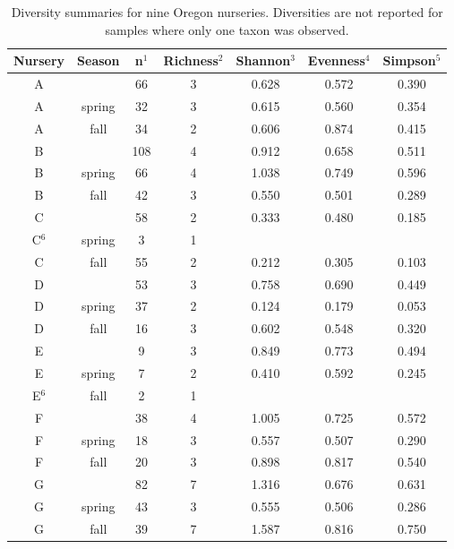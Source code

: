 \documentclass[12pt]{article}
\begin{document}
\begin{table}[ht]
\centering
\caption{Diversity summaries for nine Oregon nurseries.  Diversities are not reported for samples where only one taxon was observed.}
\label{tab:div}
\begin{tabular}{ccccccc}
  \hline
 \textbf{Nursery} &  \textbf{Season} & \textbf{n}$^{1}$ & \textbf{Richness}$^{2}$ & \textbf{Shannon}$^{3}$ & \textbf{Evenness}$^{4}$ & \textbf{Simpson}$^{5}$ \\ 
  \hline
  \rowcolor{gray!20}
  A & & 66 & 3 & 0.628 & 0.572 & 0.390 \\ 
  A & spring & 32 & 3 & 0.615 & 0.560 & 0.354 \\ 
  A & fall & 34 & 2 & 0.606 & 0.874 & 0.415 \\ 
\rowcolor{gray!20}
  B & & 108 & 4 & 0.912 & 0.658 & 0.511 \\ 
  B & spring & 66 & 4 & 1.038 & 0.749 & 0.596 \\ 
  B & fall & 42 & 3 & 0.550 & 0.501 & 0.289 \\ 
\rowcolor{gray!20}
  C & & 58 & 2 & 0.333 & 0.480 & 0.185 \\ 
  C$^{6}$ & spring & 3 & 1 &  &  &  \\ 
  C & fall & 55 & 2 & 0.212 & 0.305 & 0.103 \\ 
  \rowcolor{gray!20}
  D & & 53 & 3 & 0.758 & 0.690 & 0.449 \\ 
  D & spring & 37 & 2 & 0.124 & 0.179 & 0.053 \\ 
  D & fall & 16 & 3 & 0.602 & 0.548 & 0.320 \\ 
  \rowcolor{gray!20}
  E & & 9 & 3 & 0.849 & 0.773 & 0.494 \\ 
  E & spring & 7 & 2 & 0.410 & 0.592 & 0.245 \\ 
  E$^{6}$ & fall & 2 & 1 &  &  &  \\ 
  \rowcolor{gray!20}
  F & & 38 & 4 & 1.005 & 0.725 & 0.572 \\ 
  F & spring & 18 & 3 & 0.557 & 0.507 & 0.290 \\ 
  F & fall & 20 & 3 & 0.898 & 0.817 & 0.540 \\ 
  \rowcolor{gray!20}
  G & & 82 & 7 & 1.316 & 0.676 & 0.631 \\ 
  G & spring & 43 & 3 & 0.555 & 0.506 & 0.286 \\ 
  G & fall & 39 & 7 & 1.587 & 0.816 & 0.750 \\ 
  \hline
\end{tabular}

\end{table}
\end{document}

